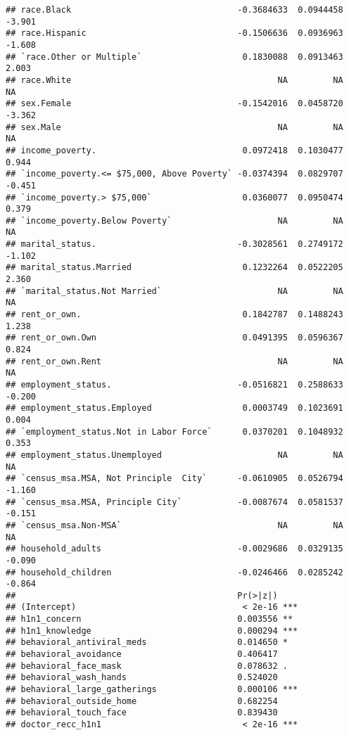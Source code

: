 \documentclass[
]{article}
\begin{document}
\begin{verbatim}
## race.Black                                 -0.3684633  0.0944458  -3.901
## race.Hispanic                              -0.1506636  0.0936963  -1.608
## `race.Other or Multiple`                    0.1830088  0.0913463   2.003
## race.White                                         NA         NA      NA
## sex.Female                                 -0.1542016  0.0458720  -3.362
## sex.Male                                           NA         NA      NA
## income_poverty.                             0.0972418  0.1030477   0.944
## `income_poverty.<= $75,000, Above Poverty` -0.0374394  0.0829707  -0.451
## `income_poverty.> $75,000`                  0.0360077  0.0950474   0.379
## `income_poverty.Below Poverty`                     NA         NA      NA
## marital_status.                            -0.3028561  0.2749172  -1.102
## marital_status.Married                      0.1232264  0.0522205   2.360
## `marital_status.Not Married`                       NA         NA      NA
## rent_or_own.                                0.1842787  0.1488243   1.238
## rent_or_own.Own                             0.0491395  0.0596367   0.824
## rent_or_own.Rent                                   NA         NA      NA
## employment_status.                         -0.0516821  0.2588633  -0.200
## employment_status.Employed                  0.0003749  0.1023691   0.004
## `employment_status.Not in Labor Force`      0.0370201  0.1048932   0.353
## employment_status.Unemployed                       NA         NA      NA
## `census_msa.MSA, Not Principle  City`      -0.0610905  0.0526794  -1.160
## `census_msa.MSA, Principle City`           -0.0087674  0.0581537  -0.151
## `census_msa.Non-MSA`                               NA         NA      NA
## household_adults                           -0.0029686  0.0329135  -0.090
## household_children                         -0.0246466  0.0285242  -0.864
##                                            Pr(>|z|)    
## (Intercept)                                 < 2e-16 ***
## h1n1_concern                               0.003556 ** 
## h1n1_knowledge                             0.000294 ***
## behavioral_antiviral_meds                  0.014650 *  
## behavioral_avoidance                       0.406417    
## behavioral_face_mask                       0.078632 .  
## behavioral_wash_hands                      0.524020    
## behavioral_large_gatherings                0.000106 ***
## behavioral_outside_home                    0.682254    
## behavioral_touch_face                      0.839430    
## doctor_recc_h1n1                            < 2e-16 ***

\end{verbatim}
\end{document}
